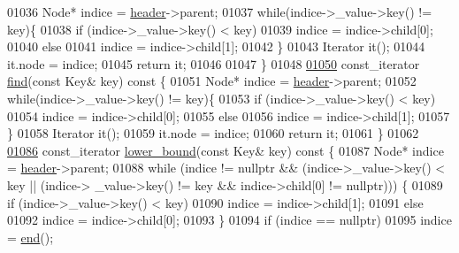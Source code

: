 \begin{DoxyCode}
01036         Node* indice = \hyperlink{classaed2_1_1map_a92d93f905c8ad73fba18fdc7e8915cce_a92d93f905c8ad73fba18fdc7e8915cce}{header}->parent;
01037         \textcolor{keywordflow}{while}(indice->\_value->key() != key)\{
01038             \textcolor{keywordflow}{if} (indice->\_value->key() < key)
01039                 indice = indice->child[0];
01040             \textcolor{keywordflow}{else}
01041                 indice = indice->child[1];
01042         \}
01043         Iterator it();
01044         it.node = indice;
01045         \textcolor{keywordflow}{return} it;
01046 
01047     \}
01048 
\hypertarget{map2_8h_source_l01050}{}\hyperlink{classaed2_1_1map_ab8f3e41b1a0d7b74645836f8d2e1acfc_ab8f3e41b1a0d7b74645836f8d2e1acfc}{01050}     const\_iterator \hyperlink{classaed2_1_1map_ab8f3e41b1a0d7b74645836f8d2e1acfc_ab8f3e41b1a0d7b74645836f8d2e1acfc}{find}(\textcolor{keyword}{const} Key& key)\textcolor{keyword}{ const }\{
01051             Node* indice = \hyperlink{classaed2_1_1map_a92d93f905c8ad73fba18fdc7e8915cce_a92d93f905c8ad73fba18fdc7e8915cce}{header}->parent;
01052         \textcolor{keywordflow}{while}(indice->\_value->key() != key)\{
01053             \textcolor{keywordflow}{if} (indice->\_value->key() < key)
01054                 indice = indice->child[0];
01055             \textcolor{keywordflow}{else}
01056                 indice = indice->child[1];
01057         \}
01058         Iterator it();
01059         it.node = indice;
01060         \textcolor{keywordflow}{return} it;
01061     \}
01062 
\hypertarget{map2_8h_source_l01086}{}\hyperlink{classaed2_1_1map_a3399d36fdd5a880b494f3a5795d3f18f_a3399d36fdd5a880b494f3a5795d3f18f}{01086}     const\_iterator \hyperlink{classaed2_1_1map_a3399d36fdd5a880b494f3a5795d3f18f_a3399d36fdd5a880b494f3a5795d3f18f}{lower_bound}(\textcolor{keyword}{const} Key& key)\textcolor{keyword}{ const }\{
01087         Node* indice = \hyperlink{classaed2_1_1map_a92d93f905c8ad73fba18fdc7e8915cce_a92d93f905c8ad73fba18fdc7e8915cce}{header}->parent;
01088         \textcolor{keywordflow}{while} (indice != \textcolor{keyword}{nullptr} && (indice->\_value->key() < key || (indice->
      \_value->key() != key && indice->child[0] != \textcolor{keyword}{nullptr}))) \{
01089             \textcolor{keywordflow}{if} (indice->\_value->key() < key)
01090                 indice = indice->child[1];
01091             \textcolor{keywordflow}{else}
01092                 indice = indice->child[0];
01093         \}
01094         \textcolor{keywordflow}{if} (indice == \textcolor{keyword}{nullptr})
01095             indice = \hyperlink{classaed2_1_1map_a76023e6a56cb625513e1b5ea028bf983_a76023e6a56cb625513e1b5ea028bf983}{end}();

\end{DoxyCode}
